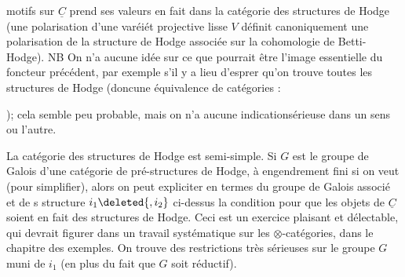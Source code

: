 motifs sur $\underline{C}$ prend ses valeurs en fait dans la catégorie des structures de Hodge (une polarisation d'une varéiét projective lisse $V$ définit canoniquement une polarisation de la structure de Hodge associée sur la cohomologie de Betti-Hodge). NB On n'a aucune idée sur ce que pourrait être l'image essentielle du foncteur précédent, par exemple s'il y a lieu d'esprer qu'on trouve toutes les structures de Hodge (doncune équivalence de catégories : ); cela semble peu probable, mais on n'a aucune indicationsérieuse dans un sens ou l'autre.

La catégorie des  structures de Hodge est semi-simple.  Si $G$ est le groupe de Galois d'une catégorie  de pré-structures de Hodge, à engendrement fini si on veut (pour simplifier), alors on peut expliciter en termes du groupe de Galois associé et de s structure $i_1\deleted{,i_2}$ ci-dessus la condition  pour que les objets de $\underline{C}$ soient en fait des structures de Hodge. Ceci est un exercice plaisant et délectable, qui devrait figurer dans un travail systématique sur les $\otimes$-catégories, dans le chapitre des exemples. On trouve des restrictions très sérieuses sur le groupe $G$  muni de $i_1$ (en plus du fait que $G$ soit réductif).

